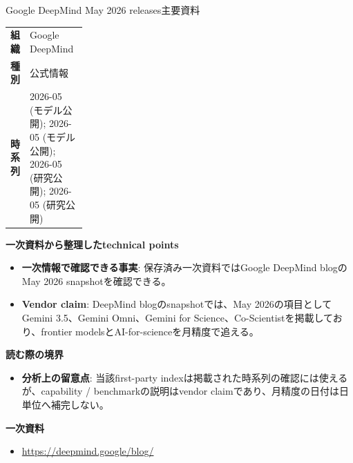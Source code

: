 \begin{technicalnote}{Google DeepMind May 2026 releases}{主要資料}
\begingroup
\begin{tabularx}{\linewidth}{@{}>{\bfseries}p{0.22\linewidth}X@{}}
組織 & Google DeepMind \\
種別 & 公式情報 \\
時系列 & 2026-05 (モデル公開); 2026-05 (モデル公開); 2026-05 (研究公開); 2026-05 (研究公開) \\
\end{tabularx}
\smallskip
{\bfseries 一次資料から整理したtechnical points}
\begin{itemize}[leftmargin=1.5em,itemsep=0.35em]
\item \textbf{一次情報で確認できる事実}: 保存済み一次資料ではGoogle DeepMind blogのMay 2026 snapshotを確認できる。
\item \textbf{Vendor claim}: DeepMind blogのsnapshotでは、May 2026の項目としてGemini 3.5、Gemini Omni、Gemini for Science、Co-Scientistを掲載しており、frontier modelsとAI-for-scienceを月精度で追える。
\end{itemize}
{\bfseries 読む際の境界}
\begin{itemize}[leftmargin=1.5em,itemsep=0.35em]
\item \textbf{分析上の留意点}: 当該first-party indexは掲載された時系列の確認には使えるが、capability / benchmarkの説明はvendor claimであり、月精度の日付は日単位へ補完しない。
\end{itemize}
\begin{samepage}
{\bfseries 一次資料}
\begingroup\sloppy
\begin{itemize}[leftmargin=1.5em,itemsep=0.25em]
\item {\scriptsize\url{https://deepmind.google/blog/}}
\end{itemize}
\endgroup
\end{samepage}
\endgroup
\end{technicalnote}
\medskip

